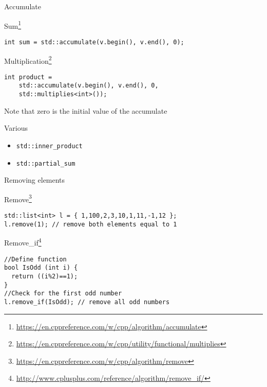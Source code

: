 \documentclass[12pt,t]{beamer}
\begin{document}
\begin{frame}[fragile]{Accumulate}

\begin{block}{Sum\footnote{\tiny\url{https://en.cppreference.com/w/cpp/algorithm/accumulate}}}
\begin{lstlisting}
int sum = std::accumulate(v.begin(), v.end(), 0);
\end{lstlisting}
\end{block}

\begin{block}{Multiplication\footnote{\tiny\url{https://en.cppreference.com/w/cpp/utility/functional/multiplies}}}
\begin{lstlisting}
int product = 
	std::accumulate(v.begin(), v.end(), 0, 
	std::multiplies<int>());
\end{lstlisting}
\end{block}
Note that zero is the initial value of the accumulate

\begin{block}{Various}
\begin{itemize}
\item \lstinline|std::inner_product| 
\item \lstinline|std::partial_sum|
\end{itemize}
\end{block}

\end{frame}

\begin{frame}[fragile]{Removing elements}

\begin{block}{Remove\footnote{\tiny\url{https://en.cppreference.com/w/cpp/algorithm/remove}}}
\begin{lstlisting}
std::list<int> l = { 1,100,2,3,10,1,11,-1,12 };
l.remove(1); // remove both elements equal to 1
\end{lstlisting}
\end{block}

\begin{block}{Remove\_if\footnote{\tiny\url{http://www.cplusplus.com/reference/algorithm/remove_if/}}}
\begin{lstlisting}
//Define function
bool IsOdd (int i) {
  return ((i%2)==1);
}
//Check for the first odd number
l.remove_if(IsOdd); // remove all odd numbers
\end{lstlisting}
\end{block}


\end{frame}
\end{document}
